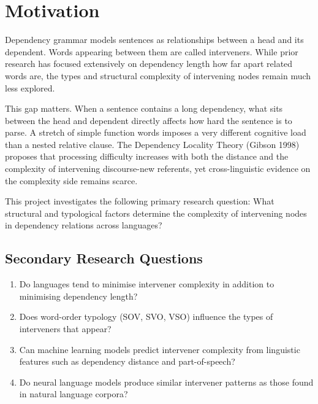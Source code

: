 \documentclass[11pt,a4paper]{article}
\begin{document}
\section{Motivation}

Dependency grammar models sentences as relationships between a head and its dependent. Words appearing between them are called interveners. While prior research has focused extensively on dependency length how far apart related words are, the types and structural complexity of intervening nodes remain much less explored.

This gap matters. When a sentence contains a long dependency, what sits between the head and dependent directly affects how hard the sentence is to parse. A stretch of simple function words imposes a very different cognitive load than a nested relative clause. The Dependency Locality Theory (Gibson 1998) proposes that processing difficulty increases with both the distance and the complexity of intervening discourse-new referents, yet cross-linguistic evidence on the complexity side remains scarce.

This project investigates the following primary research question: What structural and typological factors determine the complexity of intervening nodes in dependency relations across languages?

\subsection{Secondary Research Questions}
\begin{enumerate}[leftmargin=*, itemsep=1pt, parsep=0pt, topsep=2pt]
\item Do languages tend to minimise intervener complexity in addition to minimising dependency length?
\item Does word-order typology (SOV, SVO, VSO) influence the types of interveners that appear?
\item Can machine learning models predict intervener complexity from linguistic features such as dependency distance and part-of-speech?
\item Do neural language models produce similar intervener patterns as those found in natural language corpora?
\end{enumerate}

\end{document}
